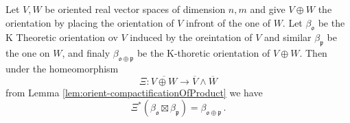 \begin{lemma}[Multiplication]\label{lem:orient-multiplication}
    Let $V,W$ be oriented real vector spaces of dimension $n,m$ and give $V\oplus W$ the orientation by placing the orientation of $V$ infront of the one of $W$. 
    Let $\beta_\mathfrak{o}$ be the K Theoretic orientation ov $V$ induced by the oreintation of $V$ and similar $\beta_\mathfrak{p}$ be the one on $W$, and finaly $\beta_{\mathfrak{o}\oplus \mathfrak{p}}$ be the K-thoretic orientation of $V\oplus W$.    Then under the homeomorphism  
    \begin{equation*}
        \Xi: \overline{V\oplus W}\to \overline{V}\wedge \overline{W}
    \end{equation*} from Lemma \ref{lem:orient-compactificationOfProduct} we have 
    \begin{equation*}
        \Xi^{*}\left(\beta_{\mathfrak o}\boxtimes\beta_{\mathfrak p}\right)=\beta_{\mathfrak o\oplus\mathfrak p}\,.
    \end{equation*}
\end{lemma}
